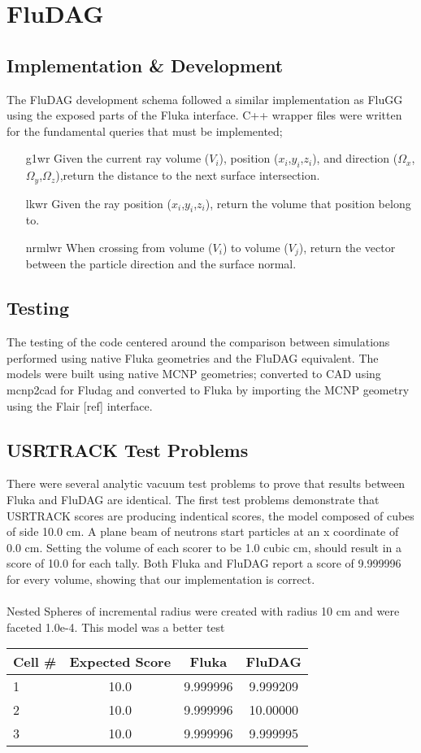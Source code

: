 \documentclass{anstrans}
\begin{document}
\section{FluDAG}
\subsection{Implementation \& Development}
The FluDAG development schema followed a similar implementation as FluGG using the exposed parts of the Fluka interface. C++ wrapper files were written for the fundamental queries that must be implemented;
\begin{itemize}
\item[g1wr]{Given the current ray volume ($V_i$), position ($x_i$,$y_i$,$z_i$), and direction ($\Omega_x$,$\Omega_y$,$\Omega_z$),return the distance to the next surface intersection.}
\item[lkwr]{Given the ray position ($x_i$,$y_i$,$z_i$), return the volume that position belong to.}	
\item[nrmlwr]{When crossing from volume ($V_i$) to volume ($V_j$), return
the vector between the particle direction and the surface normal.}
\end{itemize}
\subsection{Testing}
The testing of the code centered around the comparison between simulations performed using native Fluka geometries and the FluDAG equivalent. The models were built using native MCNP geometries; converted to CAD using mcnp2cad for Fludag and converted to Fluka by importing the MCNP geometry using the Flair [ref] interface.
\subsection*{USRTRACK Test Problems}
There were several analytic vacuum test problems to prove that results between Fluka and FluDAG are identical. The first test problems demonstrate that USRTRACK scores are producing indentical scores, the model composed of cubes of side 10.0 cm. A plane beam of neutrons start particles at an x coordinate of 0.0 cm. Setting the volume of each scorer to be 1.0 cubic cm, should result in a score of 10.0 for each tally. Both Fluka and FluDAG report a score of 9.999996 for every volume, showing that our implementation 
is correct.
\\
\\
Nested Spheres of incremental radius were created with radius 10 cm and were faceted 1.0e-4. This model was a better test 
\begin{tabular}{l|c|c|c}
Cell \# & Expected Score & Fluka  & FluDAG \\
\hline
1 & 10.0 & 9.999996 & 9.999209 \\
2 & 10.0 & 9.999996 & 10.00000 \\
3 & 10.0 & 9.999996 & 9.999995 \\
\end{tabular}
\end{document}
